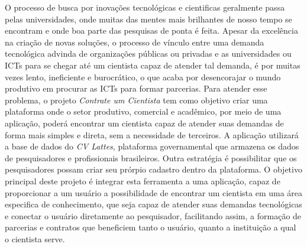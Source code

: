 \begin{resumoutfpr}
    O processo de busca por inovações tecnológicas e cientificas geralmente passa pelas universidades, onde muitas das mentes mais brilhantes de nosso tempo se encontram e onde boa parte das pesquisas de ponta é feita. Apesar da excelência na criação de novas soluções, o processo de vínculo entre uma demanda tecnológica advinda de organizações públicas ou privadas e as universidades ou ICTs para se chegar até um cientista capaz de atender tal demanda, é por muitas vezes lento, ineficiente e burocrático, o que acaba por desencorajar o mundo produtivo em procurar as ICTs para formar parcerias. Para atender esse problema, o projeto \emph{Contrate um Cientista} tem como objetivo criar uma plataforma onde o setor produtivo, comercial e acadêmico, por meio de uma aplicação, poderá encontrar um cientista capaz de atender suas demandas de forma mais simples e direta, sem a necessidade de terceiros.
    A aplicação utilizará a base de dados do \emph{CV Lattes}, plataforma governamental que armazena os dados de pesquisadores e profissionais brasileiros. Outra estratégia é possibilitar que os pesquisadores possam criar seu prórpio cadastro dentro da plataforma. O objetivo principal deste projeto é integrar esta ferramenta a uma aplicação, capaz de proporcionar a um usuário a possibilidade de encontrar um cientista em uma área especifica de conhecimento, que seja capaz de atender suas demandas tecnológicas e conectar o usuário diretamente ao pesquisador, facilitando assim, a formação de parcerias e contratos que beneficiem tanto o usuário, quanto a instituição a qual o cientista serve.
\end{resumoutfpr}
